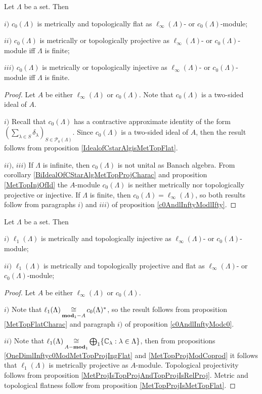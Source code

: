 \begin{proposition}\label{c0AndlInftyModc0} Let $\Lambda$ be a set. Then 

$i)$ $c_0(\Lambda)$ is metrically and topologically flat as $\ell_\infty(\Lambda)$- or $c_0(\Lambda)$-module;

$ii)$ $c_0(\Lambda)$ is metrically or topologically projective as $\ell_\infty(\Lambda)$- or $c_0(\Lambda)$-module iff $\Lambda$ is finite;

$iii)$ $c_0(\Lambda)$ is metrically or topologically injective as $\ell_\infty(\Lambda)$- or $c_0(\Lambda)$-module iff $\Lambda$ is finite.
\end{proposition}
\begin{proof} Let $A$ be either $\ell_\infty(\Lambda)$ or $c_0(\Lambda)$. Note that $c_0(\Lambda)$ is a two-sided ideal of $A$. 

$i)$ Recall that $c_0(\Lambda)$ has a contractive approximate identity of the form $(\sum_{\lambda\in S}\delta_\lambda)_{S\in\mathcal{P}_0(\Lambda)}$. Since $c_0(\Lambda)$ is a two-sided ideal of $A$, then the result follows from proposition \ref{IdealofCstarAlgisMetTopFlat}.

$ii)$, $iii)$ If $\Lambda$ is infinite, then $c_0(\Lambda)$ is not unital as Banach algebra. From corollary \ref{BiIdealOfCStarAlgMetTopProjCharac} and proposition \ref{MetTopInjOfId} the $A$-module $c_0(\Lambda)$ is neither metrically nor topologically projective or injective. If $\Lambda$ is finite, then $c_0(\Lambda)=\ell_\infty(\Lambda)$, so both results follow from paragraphs $i)$ and $iii)$ of proposition \ref{c0AndlInftyModlIfty}.
\end{proof}

\begin{proposition}\label{c0AndlInftyModl1} Let $\Lambda$ be a set. Then

$i)$ $\ell_1(\Lambda)$ is metrically and topologically injective as $\ell_\infty(\Lambda)$- or $c_0(\Lambda)$-module;

$ii)$ $\ell_1(\Lambda)$ is metrically and topologically projective and flat as $\ell_\infty(\Lambda)$- or $c_0(\Lambda)$-module;
\end{proposition}
\begin{proof} Let $A$ be either $\ell_\infty(\Lambda)$ or $c_0(\Lambda)$.

$i)$ Note that $\ell_1(\Lambda)\mathop{\mathbin{\cong}}\limits_{\mathbf{mod}_1-A}c_0(\Lambda)^*$, so the result follows from proposition \ref{MetTopFlatCharac} and paragraph $i)$ of proposition \ref{c0AndlInftyModc0}.

$ii)$ Note that $\ell_1(\Lambda)\mathop{\mathbin{\cong}}\limits_{A-\mathbf{mod}_1}\bigoplus_1\{\mathbb{C}_\lambda:\lambda\in\Lambda\}$, then from propositions \ref{OneDimlInftyc0ModMetTopProjIngFlat} and \ref{MetTopProjModCoprod} it follows that $\ell_1(\Lambda)$ is metrically projective as $A$-module. Topological projectivity follows from proposition \ref{MetProjIsTopProjAndTopProjIsRelProj}. Metric and topological flatness follow from proposition \ref{MetTopProjIsMetTopFlat}.
\end{proof}

